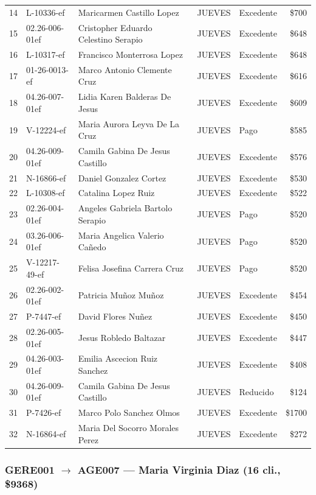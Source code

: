 \documentclass[11pt,a4paper]{article}
\newcommand{\money}[1]{\$\num{#1}}
\begin{document}
\begin{center}
\begin{longtable}{rlp{5.5cm}llr}
14 & L-10336-ef & Maricarmen Castillo Lopez & JUEVES & Excedente & \money{700} \\
15 & 02.26-006-01ef & Cristopher Eduardo Celestino Serapio & JUEVES & Excedente & \money{648} \\
16 & L-10317-ef & Francisco Monterrosa Lopez & JUEVES & Excedente & \money{648} \\
17 & 01-26-0013-ef & Marco Antonio Clemente Cruz & JUEVES & Excedente & \money{616} \\
18 & 04.26-007-01ef & Lidia Karen Balderas De Jesus & JUEVES & Excedente & \money{609} \\
19 & V-12224-ef & Maria Aurora Leyva De La Cruz & JUEVES & Pago & \money{585} \\
20 & 04.26-009-01ef & Camila Gabina De Jesus Castillo & JUEVES & Excedente & \money{576} \\
21 & N-16866-ef & Daniel Gonzalez Cortez & JUEVES & Excedente & \money{530} \\
22 & L-10308-ef & Catalina Lopez Ruiz & JUEVES & Excedente & \money{522} \\
23 & 02.26-004-01ef & Angeles Gabriela Bartolo Serapio & JUEVES & Pago & \money{520} \\
24 & 03.26-006-01ef & Maria Angelica Valerio Cañedo & JUEVES & Pago & \money{520} \\
25 & V-12217-49-ef & Felisa Josefina Carrera Cruz & JUEVES & Pago & \money{520} \\
26 & 02.26-002-01ef & Patricia Muñoz Muñoz & JUEVES & Excedente & \money{454} \\
27 & P-7447-ef & David Flores Nuñez & JUEVES & Excedente & \money{450} \\
28 & 02.26-005-01ef & Jesus Robledo Baltazar & JUEVES & Excedente & \money{447} \\
29 & 04.26-003-01ef & Emilia Ascecion Ruiz Sanchez & JUEVES & Excedente & \money{408} \\
30 & 04.26-009-01ef & Camila Gabina De Jesus Castillo & JUEVES & Reducido & \money{124} \\
31 & P-7426-ef & Marco Polo Sanchez Olmos & JUEVES & Excedente & \money{1700} \\
32 & N-16864-ef & Maria Del Socorro Morales Perez & JUEVES & Excedente & \money{272} \\

\bottomrule
\end{longtable}
\end{center}
\subsubsection{GERE001 $\rightarrow$ AGE007 --- Maria Virginia Diaz (16 cli., \money{9368})}
\end{document}
